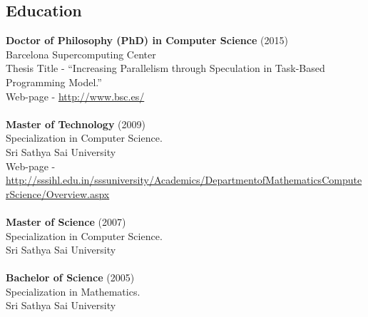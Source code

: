 \documentclass[margin]{res}
\begin{document}
\begin{resume}
\section{Education} 
{\bf Doctor of Philosophy (PhD)  in Computer Science } (2015) \\
Barcelona Supercomputing Center \\
Thesis Title - \enquote{Increasing Parallelism through Speculation in Task-Based Programming Model.}\\
Web-page - \url{http://www.bsc.es/}\\\\
%
{\bf Master of Technology }(2009) \\
Specialization in Computer Science. \\
Sri Sathya Sai University \\
Web-page - \url{http://sssihl.edu.in/sssuniversity/Academics/DepartmentofMathematicsComputerScience/Overview.aspx}\\\\
%
{\bf Master of Science }(2007) \\
Specialization in Computer Science. \\
Sri Sathya Sai University \\\\
%
{\bf Bachelor of Science} (2005) \\
Specialization in Mathematics. \\
Sri Sathya Sai University \\\\
%
%

\end{resume}
\end{document}
